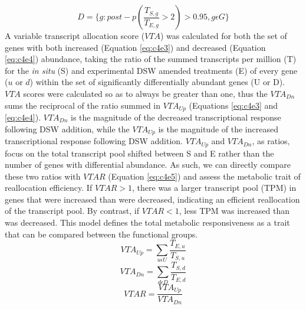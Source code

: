 \begin{equation}
	\label{eq:c4e2}
	 D = \{g : post-p(\frac{T_{S,g}}{T_{E,g}} > 2) > 0.95, g \epsilon G\}
\end{equation}
A variable transcript allocation score ($VTA$) was calculated for both the set of genes with both increased (Equation \ref{eq:c4e3}) and decreased (Equation \ref{eq:c4e4}) abundance, taking the ratio of the summed transcripts per million (T) for the \textit{in situ} (S) and experimental DSW amended treatments (E) of every gene ($u$ or $d$) within the set of significantly differentially abundant genes (U or D). $VTA$ scores were calculated so as to always be greater than one, thus the $VTA_{Dn}$ sums the reciprocal of the ratio summed in $VTA_{Up}$ (Equations \ref{eq:c4e3} and \ref{eq:c4e4}). $VTA_{Dn}$ is the magnitude of the decreased transcriptional response following DSW addition, while the $VTA_{Up}$ is the magnitude of the increased transcriptional response following DSW addition. $VTA_{Up}$ and $VTA_{Dn}$, as ratios, focus on the total transcript pool shifted between S and E rather than the number of genes with differential abundance. As such, we can directly compare these two ratios with $VTAR$ (Equation \ref{eq:c4e5}) and assess the metabolic trait of reallocation efficiency. If $VTAR > 1$, there was a larger transcript pool (TPM) in genes that were increased than were decreased, indicating an efficient reallocation of the transcript pool. By contrast, if $VTAR < 1$, less TPM was increased than was decreased. This model defines the total metabolic responsiveness as a trait that can be compared between the functional groups. 
\begin{equation}
	\label{eq:c4e3}
	VTA_{Up} = \sum_{u\epsilon U} \frac{T_{E,u}}{T_{S,u}}
\end{equation}
\begin{equation}
	\label{eq:c4e4}
	VTA_{Dn} = \sum_{d\epsilon D} \frac{T_{S,d}}{T_{E,d}}
\end{equation}
\begin{equation}
	\label{eq:c4e5}
	VTAR = \frac{VTA_{Up}}{VTA_{Dn}}
\end{equation}


